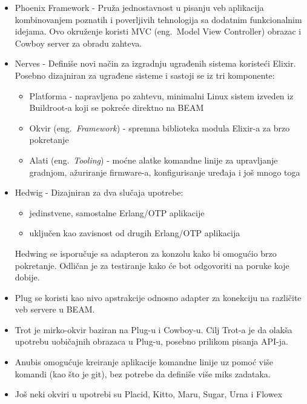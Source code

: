 \documentclass[a4paper]{article}
\begin{document}
\begin{itemize}
    \item Phoenix Framework\cite{sitePhoenix} - Pruža jednostavnost u pisanju veb aplikacija kombinovanjem poznatih i poverljivih tehnologija sa dodatnim funkcionalnim idejama. Ovo okruženje koristi MVC (eng.~{Model View Controller}) obrazac \cite{sitePhoenix} i Cowboy server \cite{knjigaPhoenix} za obradu zahteva.

    \item Nerves \cite{siteNerves} - Definiše novi način za izgradnju ugrađenih sistema koristeći Elixir. Posebno dizajniran za ugrađene sisteme i sastoji se iz tri komponente: 
    \begin{itemize}
        \item Platforma - napravljena po zahtevu, minimalni Linux sistem izveden iz Buildroot-a koji se pokreće direktno na BEAM
        \item Okvir (eng.~{\em Framework}) - spremna biblioteka modula Elixir-a za brzo pokretanje
        \item Alati (eng.~{\em Tooling}) - moćne alatke komandne linije za upravljanje gradnjom, ažuriranje firmware-a, konfigurisanje uređaja i još mnogo toga
    \end{itemize}
    
    \item Hedwig - Dizajniran za dva slučaja upotrebe: 
    \begin{itemize}
        \item jedinstvene, samostalne Erlang/OTP aplikacije
        \item uključen kao zavisnost od drugih Erlang/OTP aplikacija
    \end{itemize}
    Hedwing se isporučuje sa adapteron za konzolu kako bi omogućio brzo pokretanje. Odličan je za testiranje kako će bot odgovoriti na poruke koje dobije.
    \item Plug se koristi kao nivo apstrakcije odnosno adapter za konekciju na različite veb servere u BEAM.
    \item Trot je mirko-okvir baziran na Plug-u i Cowboy-u. Cilj Trot-a je da olakša upotrebu uobičajnih obrazaca u Plug-u, posebno prilikom pisanja API-ja.
     \item Anubis omogućuje kreiranje aplikacije komandne linije uz pomoć više komandi (kao što je git), bez potrebe da definiše više miks zadataka. 
    \item Još neki okviri u upotrebi su Placid, Kitto, Maru, Sugar, Urna i Flowex
\end{itemize}
\end{document}
